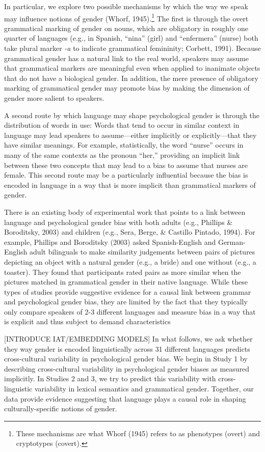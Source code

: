 \documentclass[10pt, letterpaper]{article}
\begin{document}
In particular, we explore two possible mechanisms by which the way we
speak may influence notions of gender (Whorf,
1945).\footnote{These mechanisms are what Whorf (1945) refers to as phenotypes (overt) and cryptotypes (covert).}
The first is through the overt grammatical marking of gender on nouns,
which are obligatory in roughly one quarter of languages (e.g., in
Spanish, ``nina'' (girl) and ``enfermera'' (nurse) both take plural
marker \emph{-a} to indicate grammatical femininity; Corbett, 1991).
Because grammatical gender has a natural link to the real world,
speakers may assume that grammatical markers are meaningful even when
applied to inanimate objects that do not have a biological gender. In
addition, the mere presence of obligatory marking of grammatical gender
may promote bias by making the dimension of gender more salient to
speakers.

A second route by which language may shape psychological gender is
through the distribution of words in use: Words that tend to occur in
similar context in language may lead speakers to assume---either
implicitly or explicitly---that they have similar meanings. For example,
statistically, the word ``nurse'' occurs in many of the same contexts as
the pronoun ``her,'' providing an implicit link between these two
concepts that may lead to a bias to assume that nurses are female. This
second route may be a particularly influential because the bias is
encoded in language in a way that is more implicit than grammatical
markers of gender.

There is an existing body of experimental work that points to a link
between language and psychological gender bias with both adults (e.g.,
Phillips \& Boroditsky, 2003) and children (e.g., Sera, Berge, \&
Castillo Pintado, 1994). For example, Phillips and Boroditsky (2003)
asked Spanish-English and German-English adult bilinguals to make
similarity judgements between pairs of pictures depicting an object with
a natural gender (e.g., a bride) and one without (e.g., a toaster). They
found that participants rated pairs as more similar when the pictures
matched in grammatical gender in their native language. While these
types of studies provide suggestive evidence for a causal link between
grammar and psychological gender bias, they are limited by the fact that
they typically only compare speakers of 2-3 different languages and
measure bias in a way that is explicit and thus subject to demand
characteristics

{[}INTRODUCE IAT/EMBEDDING MODELS{]} In what follows, we ask whether
they way gender is encoded linguistically across 31 different languages
predicts cross-cultural variability in psychological gender bias. We
begin in Study 1 by describing cross-cultural variability in
psychological gender biases as measured implicitly. In Studies 2 and 3,
we try to predict this variability with cross-linguistic variability in
lexical semantics and grammatical gender. Together, our data provide
evidence suggesting that language plays a causal role in shaping
culturally-specific notions of gender.
\end{document}
